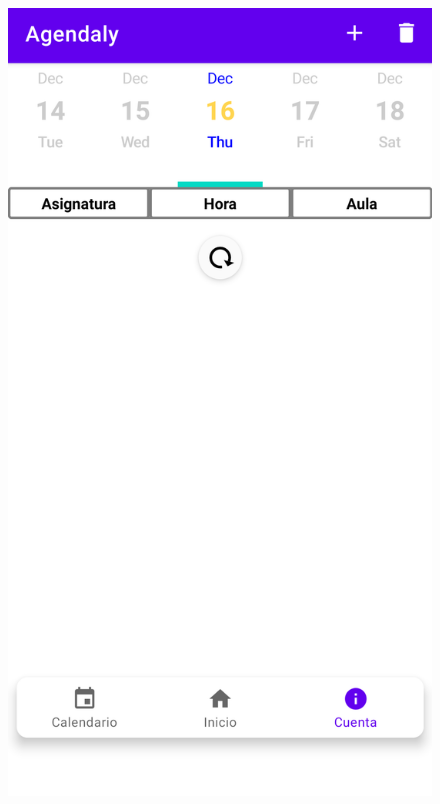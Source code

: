 \documentclass[a4paper,openright,12pt]{article}
\begin{document}
\begin{figure}
            \includegraphics[scale=0.05]{swipe.png}\hfill

\end{figure}
\end{document}
